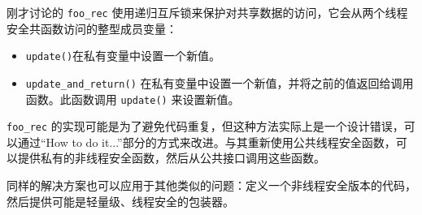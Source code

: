 
刚才讨论的 \verb|foo_rec| 使用递归互斥锁来保护对共享数据的访问，它会从两个线程安全共函数访问的整型成员变量：

\begin{itemize}
\item
\verb|update()|在私有变量中设置一个新值。

\item
\verb|update_and_return()| 在私有变量中设置一个新值，并将之前的值返回给调用函数。此函数调用 \verb|update()| 来设置新值。
\end{itemize}

\verb|foo_rec| 的实现可能是为了避免代码重复，但这种方法实际上是一个设计错误，可以通过“How to do it...”部分的方式来改进。与其重新使用公共线程安全函数，可以提供私有的非线程安全函数，然后从公共接口调用这些函数。

同样的解决方案也可以应用于其他类似的问题：定义一个非线程安全版本的代码，然后提供可能是轻量级、线程安全的包装器。













